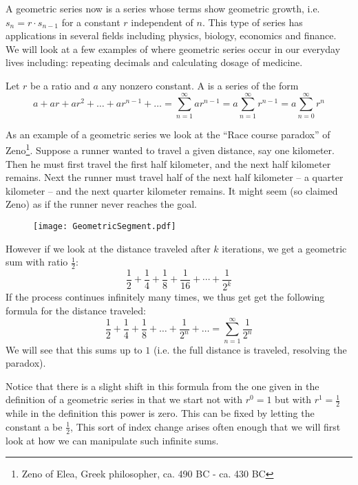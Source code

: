 A geometric series now is a series whose terms show geometric growth, i.e.
$s_n=r\cdot s_{n-1}$ for a constant $r$ independent of $n$.
This type of series has applications in several fields
including physics, biology, economics and finance. We will look at a
few examples of where geometric series occur in our everyday lives
including: repeating decimals and calculating dosage of medicine.
\begin{Definition}
Let $r$ be a ratio and $a$ any nonzero constant. A 
is a series of the form
\[
a+ ar + ar^{2}+ \ldots + ar^{n-1}+ \ldots = \sum_{n=1}^{\infty}
ar^{n-1} =a\sum_{n=1}^\infty r^{n-1}=a\sum_{n=0}^\infty r^n
\]
\end{Definition}

As an example of a geometric series we look at the ``Race course paradox'' of
Zeno\footnote{Zeno of Elea, Greek philosopher, ca. 490 BC - ca. 430 BC}.
Suppose a runner wanted to travel a given distance, say one kilometer. Then
he must first travel the first half kilometer, and the next half kilometer
remains.  Next the runner must travel half of the next half kilometer -- a
quarter kilometer  -- and the next quarter kilometer remains. It might seem
(so claimed Zeno) as if the runner never reaches the goal.

\begin{figure}[h]
\begin{center}
\texttt{[image: GeometricSegment.pdf]}
\end{center}
\end{figure}

However if we look at the distance traveled after $k$ iterations, we
get a geometric sum with ratio $\frac{1}{2}$:
\[
\frac{1}{2}+\frac{1}{4}
+\frac{1}{8}+\frac{1}{16}+\cdots+\frac{1}{2^k}
\]
If the process continues infinitely many times, we thus get get the
following formula for the distance traveled:
\[
\frac{1}{2} + \frac{1}{4} + \frac{1}{8} + \ldots + \frac{1}{2^{n}} +
\ldots = \sum_{n=1}^{\infty} \frac{1}{2^{n}}
\]
We will see that this sums up to $1$ (i.e. the full distance is traveled,
resolving the paradox).

Notice that there is a slight shift in this formula from the one
given in the definition of a geometric series in that we start not
with $r^0=1$ but with $r^{1}=\frac{1}{2}$ while in the definition
this power is zero.  This can be fixed by letting the constant a be
$\frac{1}{2}$, This sort of index change arises often enough that we
will first look at how we can manipulate such infinite sums.


